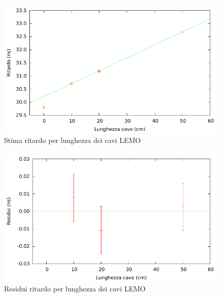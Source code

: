 \documentclass[a4paper,11pt,italian]{report}
\begin{document}
\begin{minipage}{\linewidth}
\begin{minipage}{0.45\linewidth}
\centering
\begin{figure}[H]
\includegraphics[width=\columnwidth,keepaspectratio]{../out/chio/tempo_residui}
\caption{\small{Stima ritardo per lunghezza dei cavi LEMO}}
\end{figure}
\end{minipage}
\hspace{\fill}
\begin{minipage}{0.45\linewidth}
\centering
\begin{figure}[H]
\includegraphics[width=\columnwidth,keepaspectratio]{../out/chio/tempo_ritardores}
\caption{\small{Residui ritardo per lunghezza dei cavi LEMO}}
\end{figure}
\end{minipage}
\end{minipage}
\end{document}
